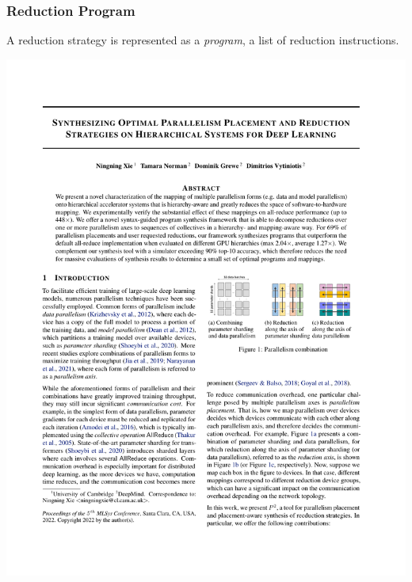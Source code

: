 \documentclass[12pt,aspectratio=169]{beamer}
\begin{document}
    \begin{frame}
        \frametitle{Reduction Program}

        A reduction strategy is represented as a \textit{program}, a list of reduction instructions.

        \begin{center}
            \includegraphics[page=6,trim=1.9cm 10.2cm 11cm 15.5cm,clip,scale=0.85]{p2.pdf}
        \end{center}


\end{frame}
\end{document}
